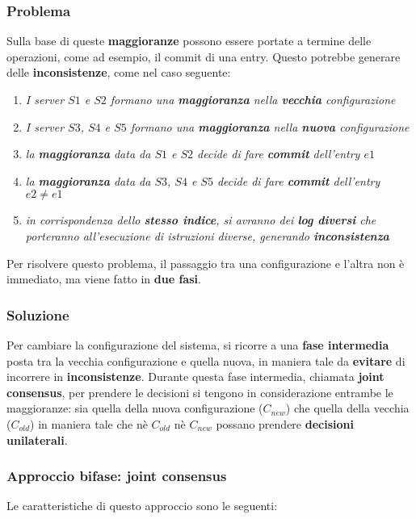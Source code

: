   \subsubsection{Problema}
    Sulla base di queste \textbf{maggioranze} possono essere portate a termine delle operazioni, come ad esempio, il commit  di una entry. Questo potrebbe generare delle \textbf{inconsistenze}, come nel caso seguente:
  \begin{enumerate}
    \item{\emph{I server $S1$ e $S2$ formano una \textbf{maggioranza} nella \textbf{vecchia} configurazione}}
    \item{\emph{I server $S3$, $S4$ e $S5$ formano una \textbf{maggioranza} nella \textbf{nuova} configurazione}}
    \item{\emph{la \textbf{maggioranza} data da $S1$ e $S2$ decide di fare \textbf{commit} dell'entry $e1$}}
    \item{\emph{la \textbf{maggioranza} data da $S3$, $S4$ e $S5$ decide di fare \textbf{commit} dell'entry $e2 \neq e1$}}
    \item{\emph{in corrispondenza dello \textbf{stesso indice}, si avranno dei \textbf{log diversi} che porteranno all'esecuzione di istruzioni diverse, generando \textbf{inconsistenza}}}
  \end{enumerate}

  Per risolvere questo problema, il passaggio tra una configurazione e l'altra non è immediato, ma viene fatto in \textbf{due fasi}.
    


  \subsubsection{Soluzione}   

    Per cambiare la configurazione del sistema, si ricorre a una \textbf{fase intermedia} posta tra la vecchia configurazione e quella nuova, in maniera tale da \textbf{evitare} di incorrere in \textbf{inconsistenze}.
    Durante questa fase intermedia, chiamata \textbf{joint consensus}, per prendere le decisioni si tengono in considerazione entrambe le maggioranze: sia quella della nuova configurazione ($C_{new}$) che quella della vecchia ($C_{old}$) in maniera tale che nè $C_{old}$ nè $C_{new}$ possano prendere \textbf{decisioni unilaterali}.

    \subsubsection{Approccio bifase: joint consensus}
    Le caratteristiche di questo approccio sono le seguenti:
    
